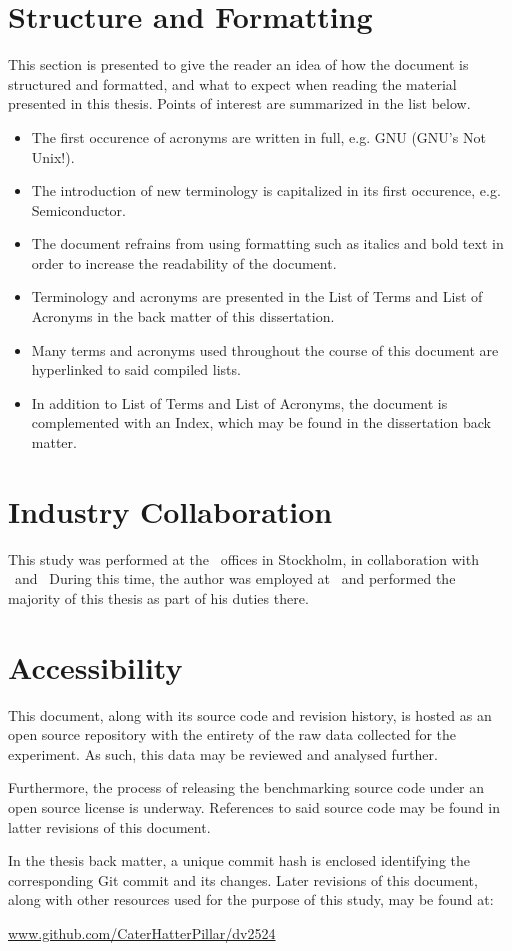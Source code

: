 \section*{Structure and Formatting}
\label{sec:preface_structureandformatting}
This section is presented to give the reader an idea of how the document is structured and formatted, and what to expect when reading the material presented in this thesis.
Points of interest are summarized in the list below.
\begin{itemize}[noitemsep]
	\item The first occurence of acronyms are written in full, e.g. GNU (GNU's Not Unix!).
	\item The introduction of new terminology is capitalized in its first occurence, e.g. Semiconductor.
	\item The document refrains from using formatting such as italics and bold text in order to increase the readability of the document.
	\item Terminology and acronyms are presented in the List of Terms and List of Acronyms in the back matter of this dissertation.
	\item Many terms and acronyms used throughout the course of this document are hyperlinked to said compiled lists.
	\item In addition to List of Terms and List of Acronyms, the document is complemented with an Index, which may be found in the dissertation back matter.
\end{itemize}

\section*{Industry Collaboration}
\label{sec:preface_industrycollaboration}
This study was performed at the \dvttermintel\ offices in Stockholm, in collaboration with \dvttermintel\ and \dvttermwindriver\
During this time, the author was employed at \dvttermintel\ and performed the majority of this thesis as part of his duties there.

\section*{Accessibility}
\label{sec:preface_accessibility}
This document, along with its source code and revision history, is hosted as an open source repository with the entirety of the raw data collected for the experiment.
As such, this data may be reviewed and analysed further.

Furthermore, the process of releasing the benchmarking source code under an open source license is underway.
References to said source code may be found in latter revisions of this document.

In the thesis back matter, a unique commit hash is enclosed identifying the corresponding Git commit and its changes.
Later revisions of this document, along with other resources used for the purpose of this study, may be found at:
\begin{center}
\href{https://github.com/CaterHatterPillar/dv2524}{www.github.com/CaterHatterPillar/dv2524}
\end{center}

